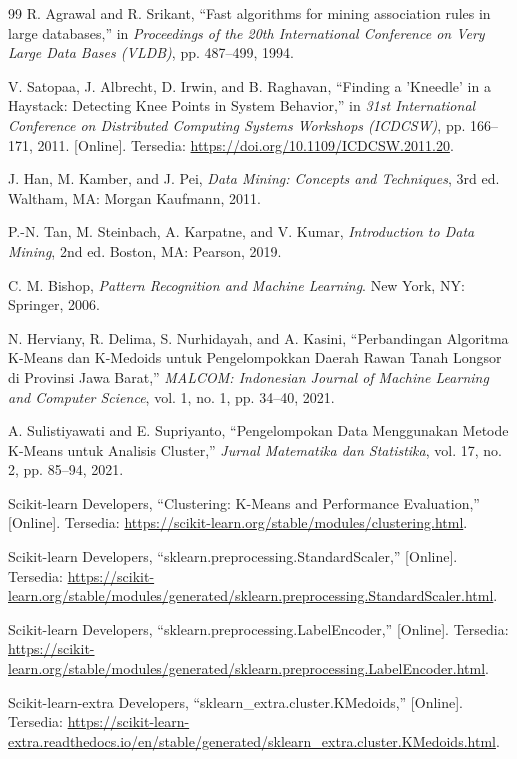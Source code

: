 \documentclass[a4paper,oneside,12pt]{report}
\begin{document}
\begin{thebibliography}{99}
     R. Agrawal and R. Srikant, ``Fast algorithms for mining association rules in large databases,'' in \textit{Proceedings of the 20th International Conference on Very Large Data Bases (VLDB)}, pp. 487--499, 1994.

     V. Satopaa, J. Albrecht, D. Irwin, and B. Raghavan, ``Finding a 'Kneedle' in a Haystack: Detecting Knee Points in System Behavior,'' in \textit{31st International Conference on Distributed Computing Systems Workshops (ICDCSW)}, pp. 166--171, 2011. [Online]. Tersedia: \url{https://doi.org/10.1109/ICDCSW.2011.20}.

     J. Han, M. Kamber, and J. Pei, \textit{Data Mining: Concepts and Techniques}, 3rd ed. Waltham, MA: Morgan Kaufmann, 2011.

     P.-N. Tan, M. Steinbach, A. Karpatne, and V. Kumar, \textit{Introduction to Data Mining}, 2nd ed. Boston, MA: Pearson, 2019.

     C. M. Bishop, \textit{Pattern Recognition and Machine Learning}. New York, NY: Springer, 2006.

     N. Herviany, R. Delima, S. Nurhidayah, and A. Kasini, ``Perbandingan Algoritma K-Means dan K-Medoids untuk Pengelompokkan Daerah Rawan Tanah Longsor di Provinsi Jawa Barat,'' \textit{MALCOM: Indonesian Journal of Machine Learning and Computer Science}, vol. 1, no. 1, pp. 34--40, 2021.

     A. Sulistiyawati and E. Supriyanto, ``Pengelompokan Data Menggunakan Metode K-Means untuk Analisis Cluster,'' \textit{Jurnal Matematika dan Statistika}, vol. 17, no. 2, pp. 85--94, 2021.

     Scikit-learn Developers, ``Clustering: K-Means and Performance Evaluation,'' [Online]. Tersedia: \url{https://scikit-learn.org/stable/modules/clustering.html}.

     Scikit-learn Developers, ``sklearn.preprocessing.StandardScaler,'' [Online]. Tersedia: \url{https://scikit-learn.org/stable/modules/generated/sklearn.preprocessing.StandardScaler.html}.

     Scikit-learn Developers, ``sklearn.preprocessing.LabelEncoder,'' [Online]. Tersedia: \url{https://scikit-learn.org/stable/modules/generated/sklearn.preprocessing.LabelEncoder.html}.

     Scikit-learn-extra Developers, ``sklearn\_extra.cluster.KMedoids,'' [Online]. Tersedia: \url{https://scikit-learn-extra.readthedocs.io/en/stable/generated/sklearn_extra.cluster.KMedoids.html}.


\end{thebibliography}
\end{document}
